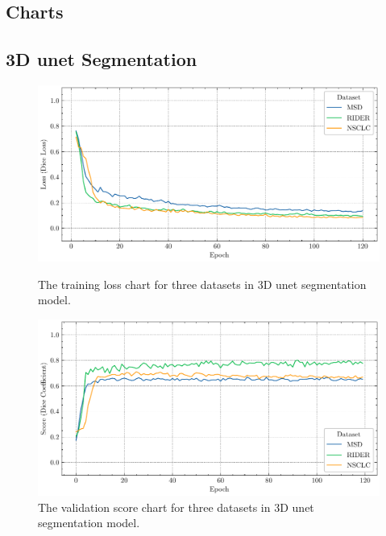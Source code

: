 \documentclass[11pt,times,oneside,openright]{eeereport}
\begin{document}
\begin{appendices}
\chapter{Charts}
\label{appendix:charts}

\section{3D \acrshort{unet} Segmentation}
\begin{figure}[!htb]
   \begin{minipage}{0.48\textwidth}
     \centering
     \includegraphics[width=\linewidth]{fig/result/seg_train.pdf}
     \caption{The training loss chart for three datasets in 3D \acrshort{unet} segmentation model.}\label{fig:app_seg_train}
   \end{minipage}\hfill
   \begin{minipage}{0.48\textwidth}
     \centering
     \includegraphics[width=\linewidth]{fig/result/seg_val.pdf}
     \caption{The validation score chart for three datasets in 3D \acrshort{unet} segmentation model.
}\label{fig:app_seg_val}
   \end{minipage}
\end{figure}


\end{appendices}
\end{document}
